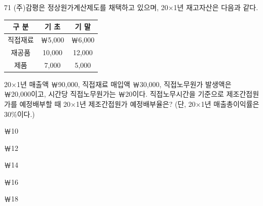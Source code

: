 \begin{question}{71}
(주)감평은 정상원가계산제도를 채택하고 있으며, 20×1년 재고자산은 다음과 같다.
\par{\small\centering\begin{tabular}{|c|c|c|}\hline
구 분 & 기 초 & 기 말 \tabularnewline\hline
직접재료 & ￦5,000 & ￦6,000 \tabularnewline\hline
재공품 & 10,000 & 12,000 \tabularnewline\hline
제품 & 7,000 & 5,000 \tabularnewline\hline
\end{tabular}\par}
20×1년 매출액 ￦90,000, 직접재료 매입액 ￦30,000, 직접노무원가 발생액은 ￦20,000이고, 시간당 직접노무원가는 ￦20이다. 직접노무시간을 기준으로 제조간접원가를 예정배부할 때 20×1년 제조간접원가 예정배부율은? (단, 20×1년 매출총이익률은 30\%이다.)
\begin{choices}
  \item ￦10
  \item ￦12
  \item ￦14
  \item ￦16
  \item ￦18
\end{choices}
\end{question}
